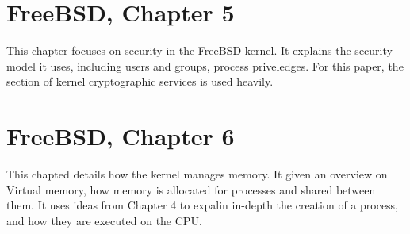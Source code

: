 \documentclass[titlepage]{article}
\begin{document}
\section{FreeBSD, Chapter 5}
\begin{singlespace}
    \cite{freebsdch5}This chapter focuses on security in the FreeBSD kernel. It explains the security model it uses, including users and groups, process priveledges. For this paper, the section of kernel cryptographic services is used heavily. 
\end{singlespace}

\section{FreeBSD, Chapter 6}
\begin{singlespace}
    \cite{freebsdch6}This chapted details how the kernel manages memory. It given an overview on Virtual memory, how memory is allocated for processes and shared between them. It uses ideas from Chapter 4 to expalin in-depth the creation of a process, and how they are executed on the CPU.
\end{singlespace}

\newpage


\end{document}
